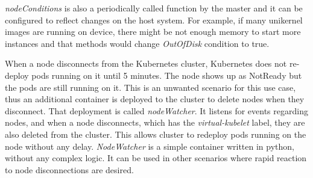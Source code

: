 \textit{nodeConditions} is also a periodically called function by the master and it can be configured to reflect changes on the host system. For example, if many unikernel images are running on device, there might be not enough memory to start more instances and that methods would change \textit{OutOfDisk} condition to true.

When a node disconnects from the Kubernetes cluster, Kubernetes does not re-deploy pods running on it until 5 minutes. The node shows up as NotReady but the pods are still running on it. This is an unwanted scenario for this use case, thus an additional container is deployed to the cluster to delete nodes when they disconnect. That deployment is called \textit{nodeWatcher}. It listens for events regarding nodes, and when a node disconnects, which has the \textit{virtual-kubelet} label, they are also deleted from the cluster. This allows cluster to redeploy pods running on the node without any delay. \textit{NodeWatcher} is a simple container written in python, without any complex logic. It can be used in other scenarios where rapid reaction to node disconnections are desired.